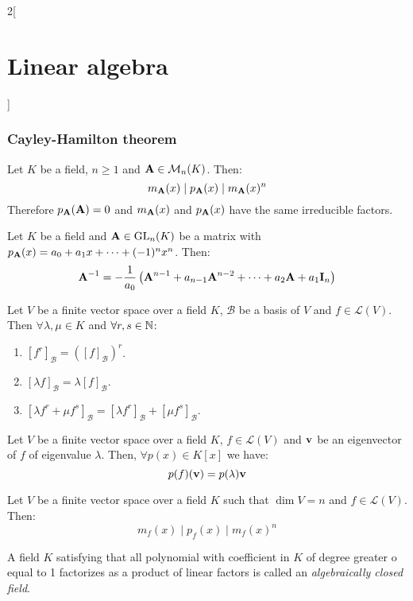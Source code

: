 \documentclass[../../../main.tex]{subfiles}
\begin{document}
\begin{multicols}{2}[\section{Linear algebra}]
  \subsubsection{Cayley-Hamilton theorem}
  \begin{theorem}
    Let $K$ be a field, $n\geq 1$ and $\boldsymbol{\mathrm{A}}\in\mathcal{M}_n(K)$. Then: $$m_{\boldsymbol{\mathrm{A}}}(x)\mid p_{\boldsymbol{\mathrm{A}}}(x)\mid m_{\boldsymbol{\mathrm{A}}}(x)^n$$ Therefore $p_{\boldsymbol{\mathrm{A}}}(\boldsymbol{\mathrm{A}})=0$ and $m_{\boldsymbol{\mathrm{A}}}(x)$ and $p_{\boldsymbol{\mathrm{A}}}(x)$ have the same irreducible factors.
  \end{theorem}
  \begin{corollary}
    Let $K$ be a field and $\boldsymbol{\mathrm{A}}\in\mathrm{GL}_n(K)$ be a matrix with $p_{\boldsymbol{\mathrm{A}}}(x)=a_0+a_1x+\cdots+(-1)^nx^n$. Then: $$\boldsymbol{\mathrm{A}}^{-1}=-\frac{1}{a_0}\left(\boldsymbol{\mathrm{A}}^{n-1}+a_{n-1}\boldsymbol{\mathrm{A}}^{n-2}+\cdots+a_2\boldsymbol{\mathrm{A}}+a_1\boldsymbol{\mathrm{I}}_n\right)$$
  \end{corollary}
  \begin{lemma}
    Let $V$ be a finite vector space over a field $K$, $\mathcal{B}$ be a basis of $V$ and $f\in\mathcal{L}(V)$. Then $\forall\lambda,\mu\in K$ and $\forall r,s\in\mathbb{N}$:
    \begin{enumerate}
      \item $[f^r]_\mathcal{B}={\left([f]_\mathcal{B}\right)}^r$.
      \item $[\lambda f]_\mathcal{B}=\lambda[f]_\mathcal{B}$.
      \item $[\lambda f^r+\mu f^s]_\mathcal{B}=[\lambda f^r]_\mathcal{B}+[\mu f^s]_\mathcal{B}$.
    \end{enumerate}
  \end{lemma}
  \begin{lemma}
    Let $V$ be a finite vector space over a field $K$, $f\in\mathcal{L}(V)$ and $\boldsymbol{\mathrm{v}}$ be an eigenvector of $f$ of eigenvalue $\lambda$. Then, $\forall p(x)\in K[x]$ we have: $$p(f)(\boldsymbol{\mathrm{v}})=p(\lambda)\boldsymbol{\mathrm{v}}$$
  \end{lemma}
  \begin{theorem}
    Let $V$ be a finite vector space over a field $K$ such that $\dim V=n$ and $f\in\mathcal{L}(V)$. Then: $$m_f(x)\mid p_f(x)\mid m_f(x)^n$$
  \end{theorem}
  \begin{definition}
    A field $K$ satisfying that all polynomial with coefficient in $K$ of degree greater o equal to 1 factorizes as a product of linear factors is called an \emph{algebraically closed field}.
  \end{definition}
  \begin{definition}

\end{definition}
\end{multicols}
\end{document}
